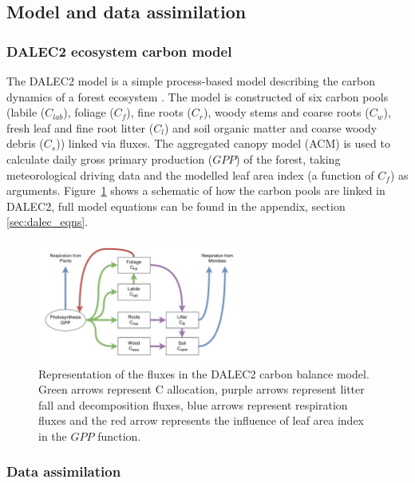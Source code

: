 \documentclass[draft,linenumbers]{agujournal}
\begin{document}
\subsection{Model and data assimilation}
\subsubsection{DALEC2 ecosystem carbon model} \label{sec:dalec2}

The DALEC2 model is a simple process-based model describing the carbon dynamics of a forest ecosystem \citep{Bloom2015}. The model is constructed of six carbon pools (labile ($C_{lab}$), foliage ($C_f$), fine roots ($C_r$), woody stems and coarse roots ($C_w$), fresh leaf and fine root litter ($C_l$) and soil organic matter and coarse woody debris ($C_s$)) linked via fluxes. The aggregated canopy model (ACM) \citep{williams1997predicting} is used to calculate daily gross primary production ($GPP$) of the forest, taking meteorological driving data and the modelled leaf area index (a function of $C_f$) as arguments. Figure~\ref{fig:DALEC_mod} shows a schematic of how the carbon pools are linked in DALEC2, full model equations can be found in the appendix, section \ref{sec:dalec_eqns}.   

\begin{figure}[ht]
    \centering
    \includegraphics[width=0.6\textwidth]{dalec2diag.pdf}
    \caption{Representation of the fluxes in the DALEC2 carbon balance model. Green arrows represent C allocation, purple arrows represent litter fall and decomposition fluxes, blue arrows represent respiration fluxes and the red arrow represents the influence of leaf area index in the $GPP$ function.} \label{fig:DALEC_mod}
\end{figure}

\subsubsection{Data assimilation} \label{sec:da}
\end{document}
